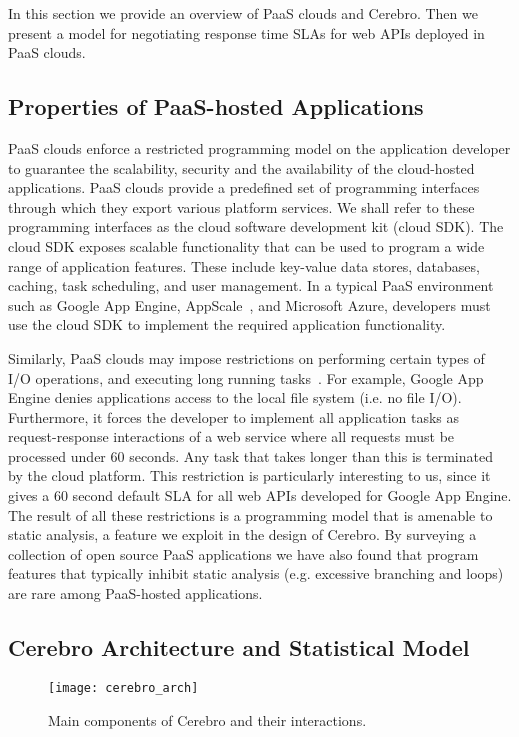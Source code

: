 In this section we provide an overview of PaaS clouds and Cerebro. Then we present a model for 
negotiating response time SLAs for web APIs deployed in PaaS clouds.

\subsection{ Properties of PaaS-hosted Applications}
PaaS clouds enforce a restricted programming model on the application developer to guarantee
the scalability, security and the availability of the cloud-hosted applications. 
PaaS clouds provide a predefined set of programming interfaces through which they export 
various platform services. We shall refer to these programming interfaces as the cloud software
development kit (cloud SDK). The cloud SDK exposes scalable functionality that can be used to 
program a wide range of application features. These include key-value data stores, databases, 
caching, task scheduling, and user management. In a typical PaaS environment
such as Google App Engine, AppScale~\cite{6488671}, and Microsoft Azure, 
developers must use the cloud SDK to implement the required application functionality.

Similarly, PaaS clouds may impose restrictions on performing
certain types of I/O operations, and executing long running tasks~\cite{gae-limits,azure-limits,gae-sandbox}. 
For example, Google App Engine
denies applications access to the local file system (i.e. no file I/O). Furthermore, it forces the
developer to implement all application tasks as request-response interactions of a web service
where all requests must be processed
under 60 seconds. Any task that takes longer than this is terminated by the cloud platform.
This restriction is particularly interesting to us, since it gives a 60 second default SLA
for all web APIs developed for Google App Engine.
The result of all these restrictions is a programming model that is
amenable to static analysis, a feature we exploit in the design of Cerebro. By surveying
a collection of open source PaaS applications we have also found that program features that typically
inhibit static analysis (e.g. excessive branching and loops) are rare among PaaS-hosted
applications.

\subsection{ Cerebro Architecture and Statistical Model}

\begin{figure}
\centering
\texttt{[image: cerebro\_arch]}
\caption{Main components of Cerebro and their interactions.}
\label{fig:cerebro_arch}
\end{figure}

